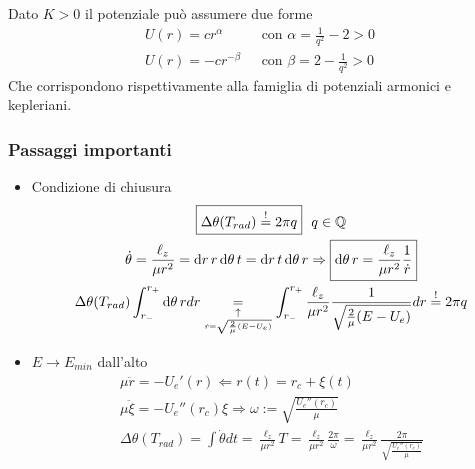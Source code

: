 \documentclass[Main.tex]{subfiles}
\begin{document}
\begin{dm}
\begin{itemize}
	\bigskip
	Dato $K>0$ il potenziale può assumere due forme
		\begin{align}
			U(r)=cr^\alpha \ \ \ &\text{con } \alpha=\frac{1}{q^2}-2 >0\\
			U(r) = -cr^{- \beta} \ \ \ &\text{con } \beta = 2 - \frac{1}{q^2}>0
		\end{align}
	Che corrispondono rispettivamente alla famiglia di potenziali armonici e kepleriani. 
	
	\subsubsection*{Passaggi importanti}
	\begin{itemize}
		\item Condizione di chiusura 
		\begin{gather*}
			\boxed{\Delta \theta(T_{rad}) \overset{!}{=} 2 \pi q} \ \ q \in \mathbb{Q}\\
			\dot \theta = \frac{\ell_z}{\mu r^2} = \dd{r}{r} \dd{\theta}{t}=\dd{r}{t} \dd{\theta}{r} \Rightarrow \boxed{ \dd{\theta}{r}= \frac{\ell_z}{\mu r^2} \frac{1}{\dot r}}\\
			\Delta \theta(T_{rad})  \int_{r_-}^{r_+}  \dd{\theta}{r} dr \underset{\underset{\dot r = \sqrt{\frac{2}{\mu} (E-U_e)}}{\uparrow}}{=} \int _{r_-}^{r_+} \frac{\ell_z}{\mu r^2} \frac{1}{\sqrt{\frac{2}{\mu} (E-U_e)}}dr\overset{!}{=} 2 \pi q
		\end{gather*}
		
		\item $E \rightarrow E_{min}$ dall'alto
		\begin{gather*}
				\mu \ddot r=-U_e'(r) \Longleftarrow r(t) =r_c +\xi(t)\\
				\mu \ddot \xi = -U_e''(r_c) \xi \Longrightarrow \boxed{\omega := \sqrt{\frac{U_e''(r_c)}{\mu}}}\\
				\Delta \theta(T_{rad}) = \int \dot \theta dt = \frac{\ell_z}{\mu r^2} T = \frac{\ell_z}{\mu r^2} \frac{2 \pi}{\omega} = \frac{\ell_z}{\mu r^2} \frac{2 \pi}{\sqrt{\frac{U_e''(r_c)}{\mu}}}
		\end{gather*}
		

\end{itemize}
\end{itemize}
\end{dm}
\end{document}
